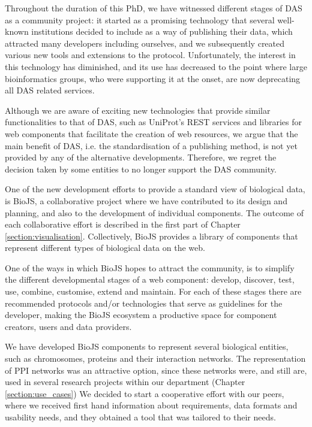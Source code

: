 Throughout the duration of this PhD, we have witnessed different stages of DAS as a community project: it started as a promising technology that several well-known institutions decided to include as a way of publishing their data, which attracted many developers including ourselves, and we subsequently created various new tools and extensions to the protocol. Unfortunately, the interest in this technology has diminished, and its use has decreased to the point where large bioinformatics groups, who were supporting it at the onset, are now deprecating all DAS related services.

Although we are aware of exciting new technologies that provide similar functionalities to that of DAS, such as UniProt's REST services and libraries for web components that facilitate the creation of web resources, we argue that the main benefit of DAS, i.e. the standardisation of a publishing method, is not yet provided by any of the alternative developments.  Therefore, we regret the decision taken by some entities to no longer support the DAS community.

\vspace{5mm}

One of the new development efforts to provide a standard view of biological data, is BioJS, a collaborative project where we have contributed to its design and planning, and also to the development of individual components.  The outcome of each collaborative effort is described in the first part of Chapter \ref{section:visualisation}. Collectively, BioJS provides a library of components that represent different types of biological data on the web. 

One of the ways in which BioJS hopes to attract the community, is to simplify the different developmental stages of a web component: develop, discover, test, use, combine, customise, extend and maintain. For each of these stages there are recommended protocols and/or technologies that serve as guidelines for the developer, making the BioJS ecosystem a productive space for component creators, users and data providers.

We have developed BioJS components to represent several biological entities, such as chromosomes, proteins and their interaction networks. The representation of PPI networks was an attractive option, since these networks were, and still are, used in several research projects within our department (Chapter \ref{section:use_cases}) We decided to start a cooperative effort with our peers, where we received first hand information about requirements, data formats and usability needs, and they obtained a tool that was tailored to their needs.

